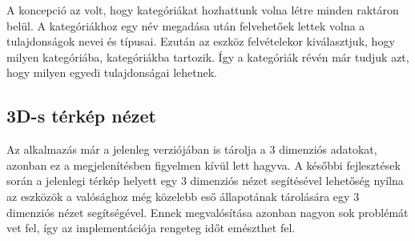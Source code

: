 A koncepció az volt, hogy kategóriákat hozhattunk volna létre minden raktáron belül.
A kategóriákhoz egy név megadása után felvehetőek lettek volna a tulajdonságok nevei és típusai.
Ezután az eszköz felvételekor kiválasztjuk, hogy milyen kategóriába, kategóriákba tartozik. 
Így a kategóriák révén már tudjuk azt, hogy milyen egyedi tulajdonságai lehetnek.

\subsection{3D-s térkép nézet}
Az alkalmazás már a jelenleg verziójában is tárolja a 3 dimenziós adatokat, azonban ez a megjelenítésben figyelmen kívül lett hagyva.
A későbbi fejlesztések során a jelenlegi térkép helyett egy 3 dimenziós nézet segítésével lehetőség nyílna az eszközök a valósághoz még közelebb eső állapotának tárolására egy 3 dimenziós nézet segítségével. Ennek megvalósítása azonban nagyon sok problémát vet fel, így az implementációja rengeteg időt emészthet fel.

